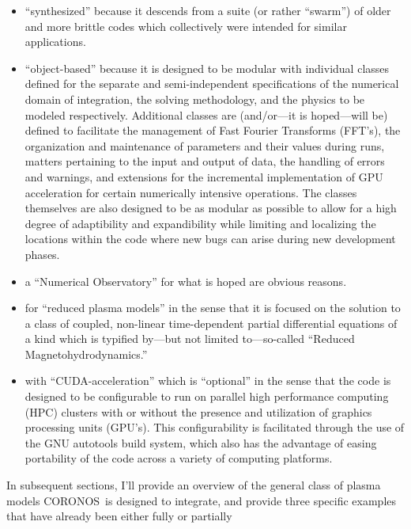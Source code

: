 \documentclass[12pt]{memoir}
\newcommand{\coronos}{\textsf{CORONOS}}
\begin{document}
\begin{itemize}
%
\item{ ``synthesized'' because it descends from a suite (or rather ``swarm'')
       of older and more brittle codes which collectively were intended for
       similar applications.
     }
%
\item{ ``object-based'' because it is designed to be modular with individual
       classes defined for the separate and semi-independent specifications of
       the numerical domain of integration, the solving methodology, and the
       physics to be modeled respectively. Additional classes are (and/or---it
       is hoped---will be) defined to facilitate the management of Fast Fourier
       Transforms (FFT's), the organization and maintenance of parameters
       and their values during runs, matters pertaining to the input and output
       of data, the handling of errors and warnings, and extensions for the
       incremental implementation of GPU acceleration for certain numerically
       intensive operations. The classes themselves are also designed to be as
       modular as possible to allow for a high degree of adaptibility and
       expandibility while limiting and localizing the locations within the
       code where new bugs can arise during new development phases.
     }
%
\item{ a ``Numerical Observatory'' for what is hoped are obvious reasons.
     }
%
\item{ for ``reduced plasma models'' in the sense that it is focused on the
       solution to a class of coupled, non-linear time-dependent partial
       differential equations of a kind which is typified by---but not limited
       to---so-called ``Reduced Magnetohydrodynamics.''
     }
%
\item{ with ``CUDA-acceleration'' which is ``optional'' in the sense that
       the code is designed to be configurable to run on parallel high
       performance computing (HPC) clusters with or without the presence and
       utilization of graphics processing units (GPU's). This configurability
       is facilitated through the use of the GNU autotools build system, which
       also has the advantage of easing portability of the code across a variety
       of computing platforms.
     }
%
\end{itemize}
%
\par
%
In subsequent sections, I'll provide an overview of the general class
of plasma models \coronos\ is designed to integrate, and provide three
specific examples that have already been either fully or partially
\end{document}
